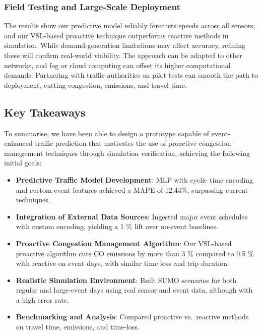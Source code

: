 \subsubsection{Field Testing and Large-Scale Deployment}
The results show our predictive model reliably forecasts speeds across all sensors, and our VSL-based proactive technique outperforms reactive methods in simulation. While demand-generation limitations may affect accuracy, refining these will confirm real-world viability. The approach can be adapted to other networks, and fog or cloud computing can offset its higher computational demands. Partnering with traffic authorities on pilot tests can smooth the path to deployment, cutting congestion, emissions, and travel time.

\subsection{Key Takeaways}
To summarise, we have been able to design a prototype capable of event-enhanced traffic prediction that motivates the use of proactive congestion management techniques through simulation verification, achieving the following initial goals:
\begin{itemize}
  \item \textbf{Predictive Traffic Model Development}: MLP with cyclic time encoding and custom event features achieved a MAPE of 12.44\%, surpassing current techniques.
  \item \textbf{Integration of External Data Sources}: Ingested major event schedules with custom encoding, yielding a 1 \% lift over no-event baselines.
  \item \textbf{Proactive Congestion Management Algorithm}: Our VSL-based proactive algorithm cuts CO emissions by more than 3 \% compared to 0.5 \% with reactive on event days, with similar time loss and trip duration.
  \item \textbf{Realistic Simulation Environment}: Built SUMO scenarios for both regular and large-event days using real sensor and event data, although with a high error rate.
  \item \textbf{Benchmarking and Analysis}: Compared proactive vs.\ reactive methods on travel time, emissions, and time-loss.
\end{itemize}



